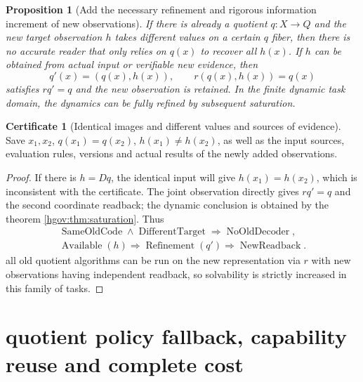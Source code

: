 \documentclass[12pt,a4paper,openany,notitlepage]{report}
\theoremstyle{plain}
\newtheorem{proposition}[theorem]{Proposition}
\theoremstyle{definition}
\newtheorem*{certificate}{Certificate}
\theoremstyle{remark}
\begin{document}
\begin{CJK*}
\begin{proposition}
[Add the necessary refinement and rigorous information increment of new observations]\label{hgov:prop:refine}
If there is already a quotient $q:X\to Q$ and the new target observation $h$ takes different values on a certain $q$ fiber, then there is no accurate reader that only relies on $q(x)$ to recover all $h(x)$. If $h$ can be obtained from actual input or verifiable new evidence, then \[
q'(x)=(q(x),h(x)),\qquad r(q(x),h(x))=q(x)
\] satisfies $rq'=q$ and the new observation is retained. In the finite dynamic task domain, the dynamics can be fully refined by subsequent saturation.\end{proposition}
\begin{certificate}
[Identical images and different values and sources of evidence]Save $x_1,x_2$, $q(x_1)=q(x_2)$, $h(x_1)\ne h(x_2)$, as well as the input sources, evaluation rules, versions and actual results of the newly added observations.\end{certificate}
\begin{proof}
If there is $h=Dq$, the identical input will give $h(x_1)=h(x_2)$, which is inconsistent with the certificate. The joint observation directly gives $rq'=q$ and the second coordinate readback; the dynamic conclusion is obtained by the theorem \ref{hgov:thm:saturation}. Thus \[
\begin{gathered}
\operatorname{SameOldCode}\land\operatorname{DifferentTarget}
\Rightarrow\operatorname{NoOldDecoder},\\
\operatorname{Available}(h)\Rightarrow\operatorname{Refinement}(q')
\Rightarrow\operatorname{NewReadback}.
\end{gathered}
\] all old quotient algorithms can be run on the new representation via $r$ with new observations having independent readback, so solvability is strictly increased in this family of tasks.\end{proof}


\section { quotient policy fallback, capability reuse and complete cost }\label{exp:gov:reuse-section}



\end{CJK*}
\end{document}
